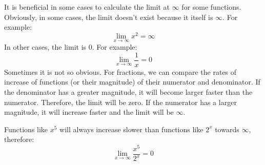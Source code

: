 \documentclass[../revisedMain.tex]{subfiles}
\begin{document}
	    It is beneficial in some cases to calculate the limit at $\infty$ for some functions. Obviously, in some cases, the limit doesn't exist because it itself is $\infty$. For example: $$\lim_{x\to\infty} x^2 = \infty$$ In other cases, the limit is 0. For example: $$\lim_{x\to\infty} \frac{1}{x}=0$$
	    Sometimes it is not so obvious. For fractions, we can compare the rates of increase of functions (or their magnitude) of their numerator and denominator. If the denominator has a greater magnitude, it will become larger faster than the numerator. Therefore, the limit will be zero. If the numerator has a larger magnitude, it will increase faster and the limit will be $\infty$. 
	    \begin{center}
	    \newline
	    Functions like $x^5$ will always increase slower than functions like $2^x$ towards $\infty$, therefore: \[\lim_{x\to\infty}\frac{x^5}{2^x}=0\]
	\end{center}
\end{document}
